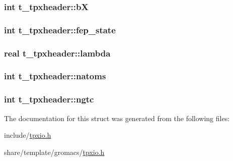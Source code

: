 \hypertarget{structt__tpxheader_a343cd0fdce2e2d0a00006ba8cbfca1da}{
\subsubsection[{b\-X}]{\setlength{\rightskip}{0pt plus 5cm}int {\bf t\-\_\-tpxheader\-::b\-X}}}\label{structt__tpxheader_a343cd0fdce2e2d0a00006ba8cbfca1da}
\hypertarget{structt__tpxheader_a737887f98f31a91a75bad3791a1c0fb3}{
\subsubsection[{fep\-\_\-state}]{\setlength{\rightskip}{0pt plus 5cm}int {\bf t\-\_\-tpxheader\-::fep\-\_\-state}}}\label{structt__tpxheader_a737887f98f31a91a75bad3791a1c0fb3}
\hypertarget{structt__tpxheader_a5f70a59140b3a5babce179de078d59d2}{
\subsubsection[{lambda}]{\setlength{\rightskip}{0pt plus 5cm}real {\bf t\-\_\-tpxheader\-::lambda}}}\label{structt__tpxheader_a5f70a59140b3a5babce179de078d59d2}
\hypertarget{structt__tpxheader_ad977f3bcb0c86767a10efd8f894269a8}{
\subsubsection[{natoms}]{\setlength{\rightskip}{0pt plus 5cm}int {\bf t\-\_\-tpxheader\-::natoms}}}\label{structt__tpxheader_ad977f3bcb0c86767a10efd8f894269a8}
\hypertarget{structt__tpxheader_aec5a7ac970999ea1ab89617f0844788a}{
\subsubsection[{ngtc}]{\setlength{\rightskip}{0pt plus 5cm}int {\bf t\-\_\-tpxheader\-::ngtc}}}\label{structt__tpxheader_aec5a7ac970999ea1ab89617f0844788a}


\-The documentation for this struct was generated from the following files\-:\begin{DoxyCompactItemize}
\item 
include/\hyperlink{include_2tpxio_8h}{tpxio.\-h}\item 
share/template/gromacs/\hyperlink{share_2template_2gromacs_2tpxio_8h}{tpxio.\-h}\end{DoxyCompactItemize}
